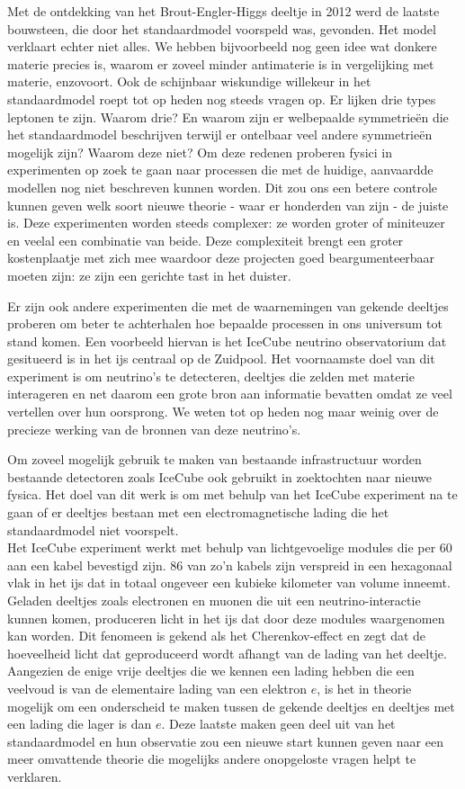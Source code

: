 \noindent Met de ontdekking van het Brout-Engler-Higgs deeltje in 2012 werd de laatste bouwsteen, die door het standaardmodel voorspeld was, gevonden. Het model verklaart echter niet alles. We hebben bijvoorbeeld nog geen idee wat donkere materie precies is, waarom er zoveel minder antimaterie is in vergelijking met materie, enzovoort. Ook de schijnbaar wiskundige willekeur in het standaardmodel roept tot op heden nog steeds vragen op. Er lijken drie types leptonen te zijn. Waarom drie? En waarom zijn er welbepaalde symmetrie\"en die het standaardmodel beschrijven terwijl er ontelbaar veel andere symmetrie\"en mogelijk zijn? Waarom deze niet? Om deze redenen proberen fysici in experimenten op zoek te gaan naar processen die met de huidige, aanvaardde modellen nog niet beschreven kunnen worden. Dit zou ons een betere controle kunnen geven welk soort nieuwe theorie - waar er honderden van zijn - de juiste is. Deze experimenten worden steeds complexer: ze worden groter of miniteuzer en veelal een combinatie van beide. Deze complexiteit brengt een groter kostenplaatje met zich mee waardoor deze projecten goed beargumenteerbaar moeten zijn: ze zijn een gerichte tast in het duister.

Er zijn ook andere experimenten die met de waarnemingen van gekende deeltjes proberen om beter te achterhalen hoe bepaalde processen in ons universum tot stand komen. Een voorbeeld hiervan is het IceCube neutrino observatorium dat gesitueerd is in het ijs centraal op de Zuidpool. Het voornaamste doel van dit experiment is om neutrino's te detecteren, deeltjes die zelden met materie interageren en net daarom een grote bron aan informatie bevatten omdat ze veel vertellen over hun oorsprong. We weten tot op heden nog maar weinig over de precieze werking van de bronnen van deze neutrino's.

Om zoveel mogelijk gebruik te maken van bestaande infrastructuur worden bestaande detectoren zoals IceCube ook gebruikt in zoektochten naar nieuwe fysica. Het doel van dit werk is om met behulp van het IceCube experiment na te gaan of er deeltjes bestaan met een electromagnetische lading die het standaardmodel niet voorspelt.\\

\noindent Het IceCube experiment werkt met behulp van lichtgevoelige modules die per 60 aan een kabel bevestigd zijn. 86 van zo'n kabels zijn verspreid in een hexagonaal vlak in het ijs dat in totaal ongeveer een kubieke kilometer van volume inneemt. Geladen deeltjes zoals electronen en muonen die uit een neutrino-interactie kunnen komen, produceren licht in het ijs dat door deze modules waargenomen kan worden. Dit fenomeen is gekend als het Cherenkov-effect en zegt dat de hoeveelheid licht dat geproduceerd wordt afhangt van de lading van het deeltje. Aangezien de enige vrije deeltjes die we kennen een lading hebben die een veelvoud is van de elementaire lading van een elektron $e$, is het in theorie mogelijk om een onderscheid te maken tussen de gekende deeltjes en deeltjes met een lading die lager is dan $e$. Deze laatste maken geen deel uit van het standaardmodel en hun observatie zou een nieuwe start kunnen geven naar een meer omvattende theorie die mogelijks andere onopgeloste vragen helpt te verklaren.\\

